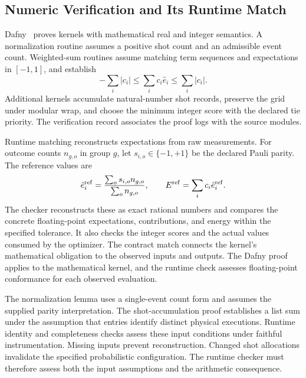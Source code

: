 \documentclass[conference]{IEEEtran}
\begin{document}
\subsection{Numeric Verification and Its Runtime Match}
\label{sec:numeric}
Dafny~\cite{dafny} proves kernels with mathematical real and integer semantics. A normalization routine assumes a positive shot count and an admissible event count. Weighted-sum routines assume matching term sequences and expectations in $[-1,1]$, and establish
\begin{equation}
 -\sum_i|c_i|\leq\sum_i c_i\hat e_i\leq\sum_i|c_i|.
 \label{eq:numericbound}
\end{equation}
Additional kernels accumulate natural-number shot records, preserve the grid under modular wrap, and choose the minimum integer score with the declared tie priority. The verification record associates the proof logs with the source modules.

Runtime matching reconstructs expectations from raw measurements. For outcome counts $n_{g,o}$ in group $g$, let $s_{i,o}\in\{-1,+1\}$ be the declared Pauli parity. The reference values are
\begin{equation}
 \hat e_i^{\rm ref}=\frac{\sum_o s_{i,o}n_{g,o}}{\sum_o n_{g,o}},
 \qquad E^{\rm ref}=\sum_i c_i\hat e_i^{\rm ref}.
 \label{eq:runtime-reference}
\end{equation}
The checker reconstructs these as exact rational numbers and compares the concrete floating-point expectations, contributions, and energy within the specified tolerance. It also checks the integer scores and the actual values consumed by the optimizer. The contract match connects the kernel's mathematical obligation to the observed inputs and outputs. The Dafny proof applies to the mathematical kernel, and the runtime check assesses floating-point conformance for each observed evaluation.

The normalization lemma uses a single-event count form and assumes the supplied parity interpretation. The shot-accumulation proof establishes a list sum under the assumption that entries identify distinct physical executions. Runtime identity and completeness checks assess these input conditions under faithful instrumentation. Missing inputs prevent reconstruction. Changed shot allocations invalidate the specified probabilistic configuration. The runtime checker must therefore assess both the input assumptions and the arithmetic consequence.
\end{document}
